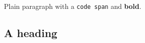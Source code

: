 Plain paragraph with a \texttt{code\ span} and \textbf{bold}.

\subsection{A heading}\label{a-heading}
